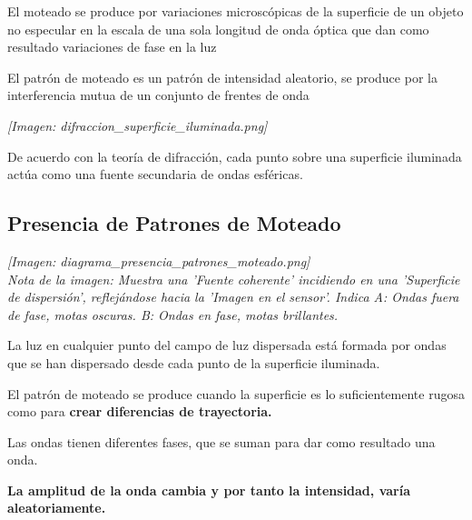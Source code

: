 \documentclass[12pt]{article}
\begin{document}
	\colorbox{olive!30}{\parbox{\textwidth}{
			El moteado se produce por variaciones microscópicas de la superficie de un objeto no especular en la escala de una sola longitud de onda óptica que dan como resultado variaciones de fase en la luz
	}}
	
	\vspace{0.3cm}
	\colorbox{olive!30}{\parbox{\textwidth}{
			El patrón de moteado es un patrón de intensidad aleatorio, se produce por la interferencia mutua de un conjunto de frentes de onda
	}}
	
	\vspace{0.3cm}
	\begin{minipage}{0.3\textwidth}
		\textit{[Imagen: difraccion\_superficie\_iluminada.png]}
	\end{minipage}
	\hfill
	\begin{minipage}{0.65\textwidth}
		\colorbox{olive!40}{\parbox{\textwidth}{
				De acuerdo con la teoría de difracción, cada punto sobre una superficie iluminada actúa como una fuente secundaria de ondas esféricas.
		}}
	\end{minipage}
	
	\subsection{Presencia de Patrones de Moteado}
	\begin{minipage}{0.45\textwidth}
		\textit{[Imagen: diagrama\_presencia\_patrones\_moteado.png]} \\
		\textit{Nota de la imagen: Muestra una 'Fuente coherente' incidiendo en una 'Superficie de dispersión', reflejándose hacia la 'Imagen en el sensor'. Indica A: Ondas fuera de fase, motas oscuras. B: Ondas en fase, motas brillantes.}
	\end{minipage}
	\hfill
	\begin{minipage}{0.5\textwidth}
		La luz en cualquier punto del campo de luz dispersada está formada por ondas que se han dispersado desde cada punto de la superficie iluminada.
		
		El patrón de moteado se produce cuando la superficie es lo suficientemente rugosa como para \textbf{crear diferencias de trayectoria.}
		
		Las ondas tienen diferentes fases, que se suman para dar como resultado una onda.
		
		\textbf{La amplitud de la onda cambia y por tanto la intensidad, varía aleatoriamente.}
	\end{minipage}
	
\end{document}
